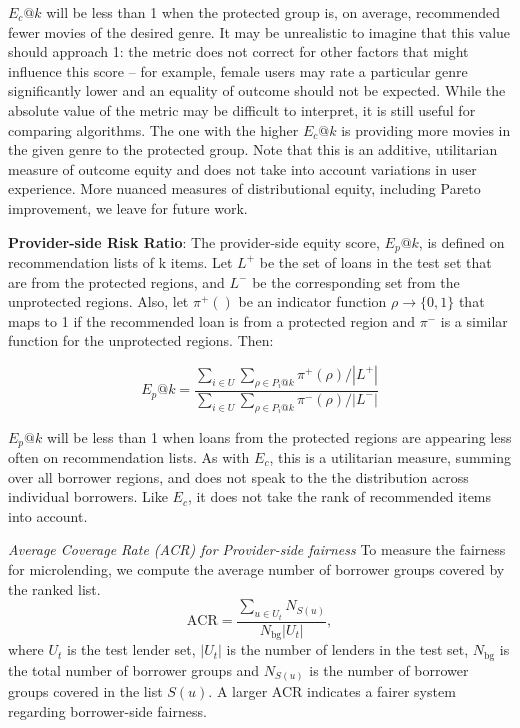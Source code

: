         $E_c@k$ will be less than 1 when the protected group is, on average, recommended fewer movies of the desired genre. It may be unrealistic to imagine that this value should approach 1: the metric does not correct for other factors that might influence this score -- for example, female users may rate a particular genre significantly lower and an equality of outcome should not be expected. While the absolute value of the metric may be difficult to interpret, it is still useful for comparing algorithms. The one with the higher $E_c@k$ is providing more movies in the given genre to the protected group. Note that this is an additive, utilitarian measure of outcome equity and does not take into account variations in user experience. More nuanced measures of distributional equity, including Pareto improvement, we leave for future work.
        
        
        \textbf{Provider-side Risk Ratio}: The provider-side equity score, $E_p@k$, is defined on recommendation lists of k items. Let $L^+$ be the set of loans in the test set that are from the protected regions, and $L^-$ be the corresponding set from the unprotected regions. Also, let $\pi^+()$ be an indicator function $\rho \rightarrow \{0,1\}$ that maps to 1 if the recommended loan is from a protected region and $\pi^-$ is a similar function for the unprotected regions. Then:

        \begin{equation}
        E_p@k=\frac{\sum_{i \in U}{\sum_{\rho \in P_i@k}{\pi^+(\rho)}}/|L^+|}
        {\sum_{i \in U}{\sum_{\rho \in P_i@k}{\pi^-(\rho)}}/|L^-|}
        \end{equation}
        
        $E_p@k$ will be less than 1 when loans from the protected regions are appearing less often on recommendation lists. As with $E_c$, this is a utilitarian measure, summing over all borrower regions, and does not speak to the the distribution across individual borrowers. Like $E_c$, it does not take the rank of recommended items into account.


        \textit{Average Coverage Rate (ACR) for Provider-side fairness}
        To measure the fairness for microlending, we compute the average number of borrower groups covered by the ranked list.
        \begin{equation}
            \text{ACR}=\frac{\sum_{u\in U_t}N_{S(u)}}{N_\text{bg}|U_t|},
        \end{equation}
        where $U_t$ is the test lender set, $|U_t|$ is the number of lenders in the test set, $N_\text{bg}$ is the total number of borrower groups and $N_{S(u)}$ is the number of borrower groups covered in the list $S(u)$. A larger ACR indicates a fairer system regarding borrower-side fairness.
        
